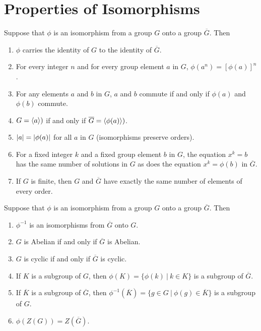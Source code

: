\section{Properties of Isomorphisms}

\begin{theorem}
	Suppose that $\phi$ is an isomorphism from a group $G$ onto a group $\overline{G}$. Then
	\begin{enumerate}
		\item $\phi$ carries the identity of $G$ to the identity of $\overline{G}$.
		\item For every integer $n$ and for every group element $a$ in $G$, $\phi(a^n)=[\phi(a)]^n$.
		\item For any elements $a$ and $b$ in $G$, $a$ and $b$ commute if and only if $\phi(a)$ and $\phi(b)$ commute.
		\item $G = \langle a \rangle)$ if and only if $\overline{G} = \langle \phi(a) \rangle)$.
		\item $\left\lvert a \right\rvert=\left\lvert \phi(a) \right\rvert$ for all $a$ in $G$ (isomorphisms preserve orders).
		\item For a fixed integer $k$ and a fixed group element $b$ in $G$, the equation $x^k=b$ has the same number of solutions in $G$ as does the equation $x^k = \phi(b)$ in $\overline{G}$.
		\item If $G$ is finite, then $G$ and $\overline{G}$ have exactly the same number of elements of every order.
	\end{enumerate}
\end{theorem}

\begin{theorem}
	Suppose that $\phi$ is an isomorphism from a group $G$ onto a group $\overline{G}$. Then
	\begin{enumerate}
		\item $\phi^{-1}$ is an isomorphisms from $\overline{G}$ onto $G$.
		\item $G$ is Abelian if and only if $\overline{G}$ is Abelian.
		\item $G$ is cyclic if and only if $\overline{G}$ is cyclic.
		\item If $K$ is a subgroup of $G$, then $\phi(K) = \{\phi(k)\ \vert\ k \in K\}$ is a subgroup of $\overline{G}$.
		\item If $\overline{K}$ is a subgroup of $\overline{G}$, then $\phi^{-1}(\overline{K}) = \{g \in G\ \vert\ \phi(g) \in \overline{K}\}$ is a subgroup of $G$.
		\item $\phi(Z(G))=Z(\overline{G})$.
	\end{enumerate}
\end{theorem}
